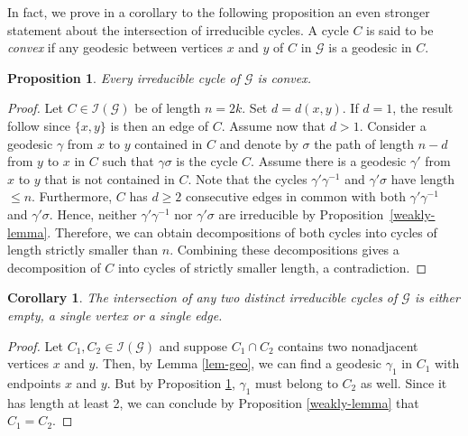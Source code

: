 \documentclass[A4paper, oneside]{amsart}
\newcommand{\Irr}{\mathcal{I}}
\newcommand{\G}{\mathcal{G}}
\newtheorem{cor}[thm]{Corollary}
\newtheorem{prop}[thm]{Proposition}
\theoremstyle{definition}
\begin{document}
In fact, we prove in a corollary to the following proposition an even stronger statement about the intersection of irreducible cycles. A cycle $C$ is said to be {\em convex} if any geodesic between vertices $x$ and $y$ of $C$ in $\G$ is a geodesic in $C$.

\begin{prop}\label{prop:IrrConvex} Every irreducible cycle of $\G$ is convex.  
\end{prop}
\begin{proof} Let $C\in \Irr(\G)$ be of length $n=2k$.  Set $d=d(x,y)$. If $d=1$, the result follow since $\{x,y\}$ is then an edge of $C$. Assume now that $d>1$. Consider a geodesic $\gamma$ from $x$ to $y$ contained in $C$ and denote by $\sigma$ the path of length $n-d$ from $y$ to $x$ in $C$ such that $\gamma\sigma$ is the cycle $C$. Assume there is a geodesic $\gamma'$ from $x$ to $y$ that is not contained in $C$. Note that the cycles $\gamma'\gamma^{-1}$ and $\gamma'\sigma$ have length $\leq n$. Furthermore, $C$ has $d\geq 2$ consecutive edges in common with both $\gamma'\gamma^{-1}$ and $\gamma'\sigma$. Hence, neither $\gamma'\gamma^{-1}$ nor $\gamma'\sigma$ are irreducible by Proposition~\ref{weakly-lemma}. Therefore, we can obtain decompositions of both cycles into cycles of length strictly smaller than $n$. Combining these decompositions gives a decomposition of $C$ into cycles of strictly smaller length, a contradiction. 
\end{proof}

\begin{cor} \label{cor: stronger weak intersection}
	The intersection of any two distinct irreducible cycles of $\G$ is either empty, a single vertex or a single edge.
\end{cor}

\begin{proof}
	Let $C_1,C_2 \in \Irr(\G)$ and suppose $C_1 \cap C_2$ contains two nonadjacent vertices $x$ and $y$. Then, by Lemma \ref{lem-geo}, we can find a geodesic $\gamma_1$ in $C_1$ with endpoints $x$ and $y$. But by Proposition \ref{prop:IrrConvex}, $\gamma_1$ must belong to $C_2$ as well. Since it has length at least 2, we can conclude by Proposition \ref{weakly-lemma} that $C_1=C_2$.  
\end{proof}

\end{document}
